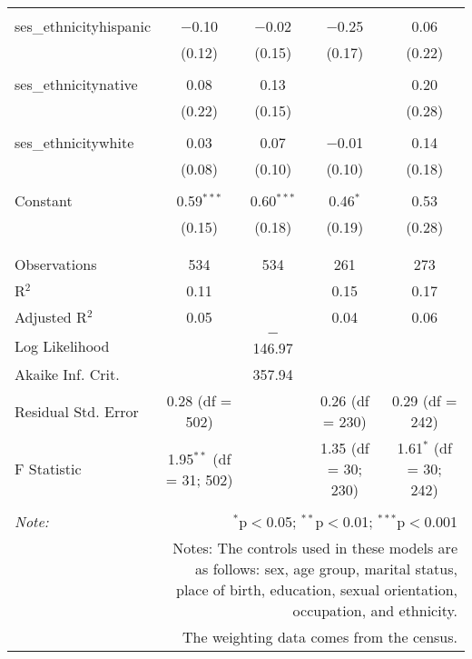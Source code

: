 \begin{table}[!htbp]
\begin{tabular}{@{\extracolsep{5pt}}lcccc}
  & & & & \\ 
 ses\_ethnicityhispanic & $-$0.10 & $-$0.02 & $-$0.25 & 0.06 \\ 
  & (0.12) & (0.15) & (0.17) & (0.22) \\ 
  & & & & \\ 
 ses\_ethnicitynative & 0.08 & 0.13 &  & 0.20 \\ 
  & (0.22) & (0.15) &  & (0.28) \\ 
  & & & & \\ 
 ses\_ethnicitywhite & 0.03 & 0.07 & $-$0.01 & 0.14 \\ 
  & (0.08) & (0.10) & (0.10) & (0.18) \\ 
  & & & & \\ 
 Constant & 0.59$^{***}$ & 0.60$^{***}$ & 0.46$^{*}$ & 0.53 \\ 
  & (0.15) & (0.18) & (0.19) & (0.28) \\ 
  & & & & \\ 
\hline \\[-1.8ex] 
Observations & 534 & 534 & 261 & 273 \\ 
R$^{2}$ & 0.11 &  & 0.15 & 0.17 \\ 
Adjusted R$^{2}$ & 0.05 &  & 0.04 & 0.06 \\ 
Log Likelihood &  & $-$146.97 &  &  \\ 
Akaike Inf. Crit. &  & 357.94 &  &  \\ 
Residual Std. Error & 0.28 (df = 502) &  & 0.26 (df = 230) & 0.29 (df = 242) \\ 
F Statistic & 1.95$^{**}$ (df = 31; 502) &  & 1.35 (df = 30; 230) & 1.61$^{*}$ (df = 30; 242) \\ 
\hline 
\hline \\[-1.8ex] 
\textit{Note:}  & \multicolumn{4}{r}{$^{*}$p$<$0.05; $^{**}$p$<$0.01; $^{***}$p$<$0.001} \\ 
 & \multicolumn{4}{r}{Notes: The controls used in these models are as follows: sex, age group, marital status, place of birth, education, sexual orientation, occupation, and ethnicity.} \\ 
 & \multicolumn{4}{r}{The weighting data comes from the census.} \\ 
\end{tabular} 
\end{table} 
